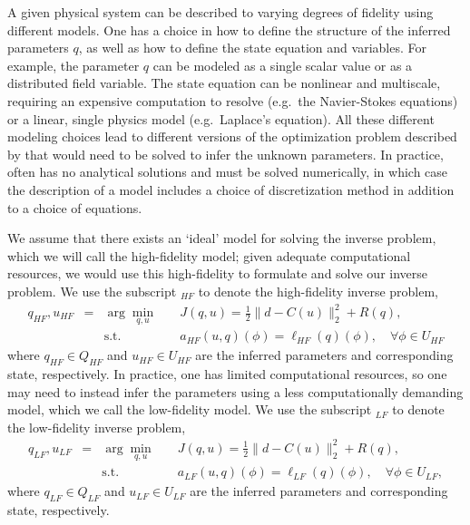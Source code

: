 A given physical system can be described to varying degrees of fidelity using different models. One has a choice in how to define the structure of the inferred parameters $q$, as well as how to define the state equation and variables. For example, the parameter $q$ can be modeled as a single scalar value or as a distributed field variable. The state equation can be nonlinear and multiscale, requiring an expensive computation to resolve (e.g.\ the Navier-Stokes equations) or a linear, single physics model (e.g.\ Laplace's equation). All these different modeling choices lead to different versions of the optimization problem described by  that would need to be solved to infer the unknown parameters. In practice,  often has no analytical solutions and must be solved numerically, in which case the description of a model includes a choice of discretization method in addition to a choice of equations.

We assume that there exists an `ideal' model for solving the inverse problem, which we will call the high-fidelity model; given adequate computational resources, we would use this high-fidelity to formulate and solve our inverse problem. We use the subscript $_{HF}$ to denote the high-fidelity inverse problem,
%
\begin{subequations}
\label{eq:invOptHF}
\begin{align}
q_{HF},u_{HF} &=&\arg\min\limits_{q,u} & \quad J(q,u)=\frac{1}{2}\|d-C(u)\|_2^2 + R(q), \label{eq:invOpt_objHF} \\
&&\textrm{s.t. }& \quad a_{HF}(u,q)(\phi)=\ell_{HF}(q)(\phi),\quad\forall\phi\in U_{HF} \label{eq:invOpt_consHF}
\end{align}
\end{subequations}
%
where $q_{HF} \in Q_{HF}$ and $u_{HF}\in U_{HF}$ are the inferred parameters and corresponding state, respectively. In practice, one has limited computational resources, so one may need to instead infer the parameters using a less computationally demanding model, which we call the low-fidelity model. We use the subscript $_{LF}$ to denote the low-fidelity inverse problem,
%
\begin{subequations}
\label{eq:invOptLF}
\begin{align}
q_{LF},u_{LF} &=& \arg\min\limits_{q,u} & \quad J(q,u)=\frac{1}{2}\|d-C(u)\|_2^2 + R(q), \label{eq:invOpt_objLF} \\
&& \textrm{s.t. }& \quad a_{LF}(u,q)(\phi)=\ell_{LF}(q)(\phi),\quad\forall\phi\in U_{LF}, \label{eq:invOpt_consLF}
\end{align}
\end{subequations}
%
where $q_{LF} \in Q_{LF}$ and $u_{LF}\in U_{LF}$ are the inferred parameters and corresponding state, respectively. 

